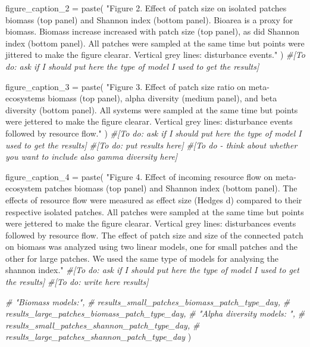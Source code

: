 \documentclass[
]{article}
\newenvironment{Shaded}{\begin{snugshade}}{\end{snugshade}}
\newcommand{\CommentTok}[1]{\textcolor[rgb]{0.56,0.35,0.01}{\textit{#1}}}
\newcommand{\FunctionTok}[1]{\textcolor[rgb]{0.00,0.00,0.00}{#1}}
\newcommand{\NormalTok}[1]{#1}
\newcommand{\OtherTok}[1]{\textcolor[rgb]{0.56,0.35,0.01}{#1}}
\newcommand{\StringTok}[1]{\textcolor[rgb]{0.31,0.60,0.02}{#1}}
\begin{document}
\begin{Shaded}
\begin{Highlighting}[]
\NormalTok{figure\_caption\_2 }\OtherTok{=} \FunctionTok{paste}\NormalTok{(}
  \StringTok{"Figure 2. Effect of patch size on isolated patches\textquotesingle{} biomass (top panel) and Shannon index (bottom panel). Bioarea is a proxy for biomass. Biomass increase increased with patch size (top panel), as did Shannon index (bottom panel). All patches were sampled at the same time but points were jittered to make the figure clearar. Vertical grey lines: disturbance events."}
\NormalTok{  )}
\CommentTok{\#[To do: ask if I should put here the type of model I used to get the results]}

\NormalTok{figure\_caption\_3 }\OtherTok{=} \FunctionTok{paste}\NormalTok{(}
  \StringTok{"Figure 3. Effect of patch size ratio on meta{-}ecosystems\textquotesingle{} biomass (top panel), alpha diversity (medium panel), and beta diversity (bottom panel). All systems were sampled at the same time but points were jettered to make the figure clearar. Vertical grey lines: disturbance events followed by resource flow."}
\NormalTok{)}
\CommentTok{\#[To do: ask if I should put here the type of model I used to get the results] }
\CommentTok{\#[To do: put results here] }
\CommentTok{\#[To do {-} think about whether you want to include also gamma diversity here]}

\NormalTok{figure\_caption\_4 }\OtherTok{=} \FunctionTok{paste}\NormalTok{(}
  \StringTok{"Figure 4. Effect of incoming resource flow on meta{-}ecosystem patches\textquotesingle{} biomass (top panel) and Shannon index (bottom panel). The effects of resource flow were measured as effect size (Hedge\textquotesingle{}s d) compared to their respective isolated patches. All patches were sampled at the same time but points were jettered to make the figure clearar. Vertical grey lines: disturbances events followed by resource flow. The effect of patch size and size of the connected patch on biomass was analyzed using two linear models, one for small patches and the other for large patches. We used the same type of models for analysing the shannon index."}
  \CommentTok{\#[To do: ask if I should put here the type of model I used to get the results]}
  \CommentTok{\#[To do: write here results]}
  
  \CommentTok{\# "Biomass models:",}
  \CommentTok{\# results\_small\_patches\_biomass\_patch\_type\_day,}
  \CommentTok{\# results\_large\_patches\_biomass\_patch\_type\_day,}
  \CommentTok{\# "Alpha diversity models: ",}
  \CommentTok{\# results\_small\_patches\_shannon\_patch\_type\_day,}
  \CommentTok{\# results\_large\_patches\_shannon\_patch\_type\_day}
\NormalTok{  )}
\end{Highlighting}
\end{Shaded}
\end{document}
